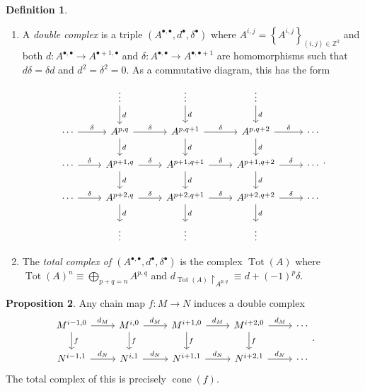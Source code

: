 \documentclass[10pt,letterpaper,cm]{nupset}
\theoremstyle{definition}
\newtheorem{definition}{Definition}[subsection]
\theoremstyle{theorem}
\newtheorem{prop}[definition]{Proposition}
\theoremstyle{remark}
\newcommand{\Z}{\mathbb Z}
\newcommand{\1}{\mathbf{1}}
\newcommand{\0}{\vec 0}
\DeclareMathOperator{\cone}{cone}
\DeclareMathOperator{\tot}{Tot}
\begin{document}
\begin{definition} $ $
\begin{enumerate}
\item A \textit{double complex} is a triple $\left(A^{\bullet, \bullet}, d^{\bullet}, \delta^{\bullet}\right)$ where $A^{i,j} = \left\{A^{i,j}\right\}_{\left(i,j\right) \in \Z^2}$ and both $d : A^{\bullet, \bullet} \to A^{\bullet +1, \bullet}$ and $\delta : A^{\bullet, \bullet} \to A^{\bullet, \bullet +1}$ are homomorphisms such that $d{\delta} = \delta{d}$ and $d^2 = \delta^2 =0$.
As a commutative diagram, this has the form
 \[
\begin{tikzcd}
                           & \vdots \arrow[d, "d"]                           & \vdots \arrow[d, "d"]                            & \vdots \arrow[d, "d"]                            &        \\
\cdots \arrow[r, "\delta"] & {A^{p,q}} \arrow[d, "d"] \arrow[r, "\delta"]    & {A^{p,q+1}} \arrow[d, "d"] \arrow[r, "\delta"]   & {A^{p,q+2}} \arrow[r, "\delta"] \arrow[d, "d"]   & \cdots \\
\cdots \arrow[r, "\delta"] & {A^{p+1, q}} \arrow[d, "d"] \arrow[r, "\delta"] & {A^{p+1,q+1}} \arrow[d, "d"] \arrow[r, "\delta"] & {A^{p+1,q+2}} \arrow[r, "\delta"] \arrow[d, "d"] & \cdots \\
\cdots \arrow[r, "\delta"] & {A^{p+2, q}} \arrow[r, "\delta"] \arrow[d, "d"] & {A^{p+2,q+1}} \arrow[r, "\delta"] \arrow[d, "d"] & {A^{p+2,q+2}} \arrow[r, "\delta"] \arrow[d, "d"] & \cdots \\
                           & \vdots                                          & \vdots                                           & \vdots                                           &       
\end{tikzcd}
.\]
\item The \textit{total complex of $\left(A^{\bullet, \bullet}, d^{\bullet}, \delta^{\bullet}\right)$} is the complex $ \tot(A)$ where $\tot(A)^n \equiv \bigoplus_{p+q =n} A^{p,q}$ and $d_{\tot(A)}\restriction_{A^{p,q}} \equiv d + ({-1})^p \delta$. 
\end{enumerate}
\end{definition}

\begin{prop}
Any chain map $f: M \to N$ induces a double complex 
\[
\begin{tikzcd}
{M^{i-1, 0}} \arrow[d, "f"] \arrow[r, "d_M"] & M^{i,0} \arrow[d, "f"] \arrow[r, "d_M"] & M^{i+1,0} \arrow[d, "f"] \arrow[r, "d_M"] & M^{i+2,0} \arrow[d, "f"] \arrow[r, "d_M"] & \cdots \\
{N^{i-1,1}} \arrow[r, "d_N"]                 & N^{i,1} \arrow[r, "d_N"]                & N^{i+1,1} \arrow[r, "d_N"]                & N^{i+2,1} \arrow[r, "d_N"]                & \cdots
\end{tikzcd}
.\]
The total complex of this is precisely $\cone(f)$.
\end{prop}
\end{document}
